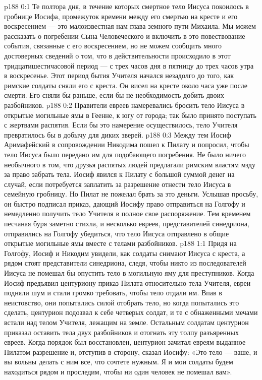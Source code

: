 \author{Комиссия срединников}
\vs p188 0:1 Те полтора дня, в течение которых смертное тело Иисуса покоилось в гробнице Иосифа, промежуток времени между его смертью на кресте и его воскресением --- это малоизвестная нам глава земного пути Михаила. Мы можем рассказать о погребении Сына Человеческого и включить в это повествование события, связанные с его воскресением, но не можем сообщить много достоверных сведений о том, что в действительности происходило в этот тридцатишестичасовой период --- с трех часов дня в пятницу до трех часов утра в воскресенье. Этот период бытия Учителя начался незадолго до того, как римские солдаты сняли его с креста. Он висел на кресте около часа уже после смерти. Его сняли бы раньше, если бы не необходимость добить двоих разбойников.
\vs p188 0:2 Правители евреев намеревались бросить тело Иисуса в открытые могильные ямы в Геенне, к югу от города; так было принято поступать с жертвами распятия. Если бы это намерение осуществилось, тело Учителя превратилось бы в добычу для диких зверей.
\vs p188 0:3 Между тем Иосиф Аримафейский в сопровождении Никодима пошел к Пилату и попросил, чтобы тело Иисуса было передано им для подобающего погребения. Не было ничего необычного в том, что друзья распятых людей предлагали римским властям мзду за право забрать тела. Иосиф явился к Пилату с большой суммой денег на случай, если потребуется заплатить за разрешение отнести тело Иисуса в семейную гробницу. Но Пилат не пожелал брать за это деньги. Услышав просьбу, он быстро подписал приказ, дающий Иосифу право отправиться на Голгофу и немедленно получить тело Учителя в полное свое распоряжение. Тем временем песчаная буря заметно стихла, и несколько евреев, представителей синедриона, отправились на Голгофу убедиться, что тело Иисуса отправлено в общие открытые могильные ямы вместе с телами разбойников.
\vs p188 1:1 Придя на Голгофу, Иосиф и Никодим увидели, как солдаты снимают Иисуса с креста, а рядом стоят представители синедриона, следя, чтобы никто из последователей Иисуса не помешал бы опустить тело в могильную яму для преступников. Когда Иосиф предъявил центуриону приказ Пилата относительно тела Учителя, евреи подняли шум и стали громко требовать, чтобы тело отдали им. Впав в неистовство, они попытались силой отобрать тело, но когда попытались это сделать, центурион подозвал к себе четверых солдат, и те с обнаженными мечами встали над телом Учителя, лежащим на земле. Остальным солдатам центурион приказал оставить тела двух разбойников и отогнать эту толпу разъяренных евреев. Когда порядок был восстановлен, центурион зачитал евреям выданное Пилатом разрешение и, отступив в сторону, сказал Иосифу: «Это тело --- ваше, и вы вольны делать с ним все, что сочтете нужным. Я и мои солдаты будем находиться рядом и проследим, чтобы ни один человек не помешал вам».
